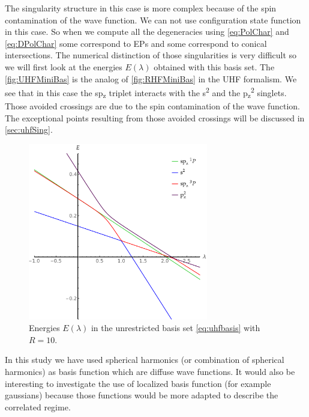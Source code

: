 \documentclass[11pt,a4paper]{article}
\begin{document}
The singularity structure in this case is more complex because of the spin contamination of the wave function. We can not use configuration state function in this case. So when we compute all the degeneracies using \eqref{eq:PolChar} and \eqref{eq:DPolChar} some correspond to EPs and some correspond to conical intersections. The numerical distinction of those singularities is very difficult so we will first look at the energies $E(\lambda)$ obtained with this basis set. The \autoref{fig:UHFMiniBas} is the analog of \autoref{fig:RHFMiniBas} in the UHF formalism. We see that in this case the sp\textsubscript{z} triplet interacts with the s\textsuperscript{2} and the p\textsubscript{z}\textsuperscript{2} singlets. Those avoided crossings are due to the spin contamination of the wave function. The exceptional points resulting from those avoided crossings will be discussed in \autoref{sec:uhfSing}. \\

\begin{figure}[h!]
    \centering
    \includegraphics[width=0.7\textwidth]{EMP_UHF_R10.pdf}
    \caption{\centering Energies $E(\lambda)$ in the unrestricted basis set \eqref{eq:uhfbasis} with $R=10$.}
    \label{fig:UHFMiniBas}
\end{figure}

In this study we have used spherical harmonics (or combination of spherical harmonics) as basis function which are diffuse wave functions. It would also be interesting to investigate the use of localized basis function \cite{Seidl_2018} (for example gaussians) because those functions would be more adapted to describe the correlated regime. \\
\end{document}
